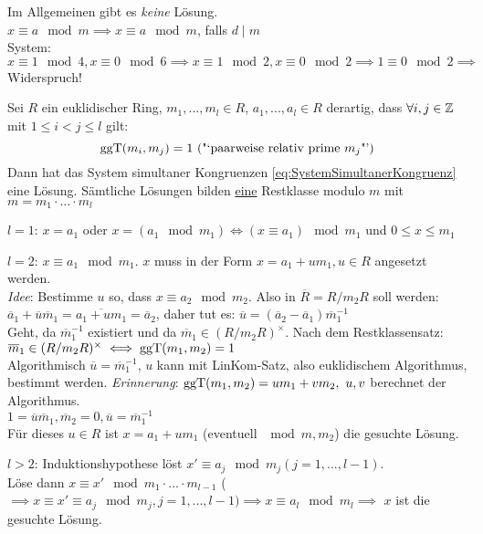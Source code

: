 \documentclass[a4paper,DIV15,BCOR12mm]{article}
\begin{document}
\begin{bemerkung}
    Im Allgemeinen gibt es \emph{keine} Lösung.\\
    $x \equiv a \mod m \implies x \equiv a \mod m$, falls $d \mid m$\\
    System: $x \equiv 1 \mod 4, x \equiv 0 \mod 6 \implies x \equiv 1 \mod 2, x \equiv 0 \mod 2 \implies 1 \equiv 0 \mod 2 \implies$ Widerspruch!
\end{bemerkung}

\begin{satz}
    Sei $R$ ein euklidischer Ring, $m_1, ..., m_l \in R$, $a_1,...,a_l \in R$ derartig, dass $\forall i,j \in \mathbb{Z}$ mit $1 \le i < j \le l$ gilt:\\
    \[ \mathop{\rm ggT}\nolimits(m_i, m_j) = 1\text{ ("`paarweise relativ prime $m_j$"')}\]
    Dann hat das System simultaner Kongruenzen \eqref{eq:SystemSimultanerKongruenz} eine Lösung. Sämtliche Lösungen bilden \underline{eine} Restklasse modulo $m$ mit $m = m_1 \cdot \ldots \cdot m_l$
\end{satz}

\begin{beweis}
\begin{description}
    \item{$l=1$:} $x = a_1$ oder $x = (a_1 \mod m_1) \iff (x \equiv a_1) \mod m_1$ und $0 \le x \le m_1$
    \item{$l=2$:} $x \equiv a_1 \mod m_1$. $x$ muss in der Form $x = a_1 + um_1, u \in R$ angesetzt
        werden.\\
        \emph{Idee}: Bestimme $u$ so, dass $x \equiv a_2 \mod m_2$. Also in $\overline R = R / m_2R$
        soll werden:\\
        $\overline a_1 + \overline u \overline m_1 = \overline{a_1 + um_1} = \overline a_2$, daher tut
         es: $\overline u = (\overline a_2 - \overline a_1)\overline m_1^{-1}$\\
    Geht, da $\overline m_1^{-1}$ existiert und da $\overline m_1 \in (R/m_2R)^\times$. Nach
    dem Restklassensatz: $\overline m_1 \in (R/m_2R)^\times \iff \mathop{\rm ggT}\nolimits(m_1,m_2) = 1$\\
    Algorithmisch $\overline u = \overline m_1^{-1}$, $u$ kann mit LinKom-Satz, also
    euklidischem Algorithmus, bestimmt werden. \emph{Erinnerung}: $\mathop{\rm ggT}\nolimits(m_1,m_2) = um_1 + vm_2,\ u,v$
    berechnet der Algorithmus.\\
    $1 = \overline u \overline m_1, \overline m_2 = 0, \overline u = \overline m_1^{-1}$\\
    Für dieses $u \in R$ ist $x = a_1 + um_1$ (eventuell $\mod m, m_2$) die gesuchte
    Lösung.
    \item{$l>2$:} Induktionshypothese löst $x' \equiv a_j \mod m_j (j = 1,..., l-1)$.\\
     Löse dann $x \equiv x' \mod m_1 \cdot ... \cdot m_{l-1}$ ($\implies x \equiv x' \equiv a_j \mod m_j, j=1,...,l-1) \implies x \equiv a_l \mod m_l \implies$ $x$ ist die gesuchte Lösung.
\end{description}
\end{beweis}
\end{document}

